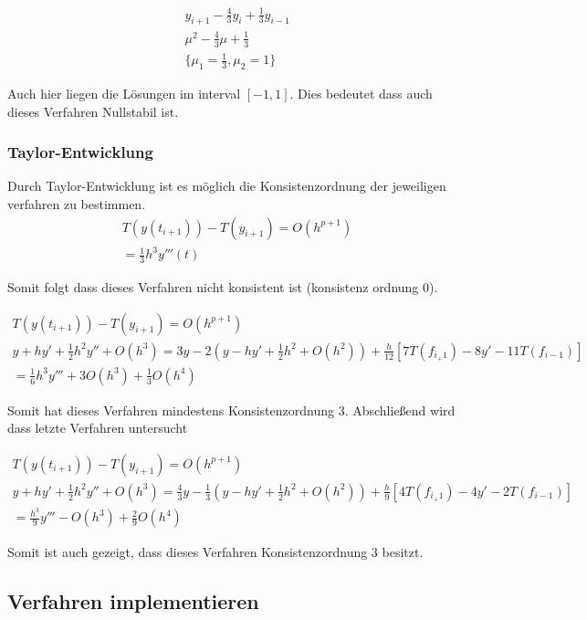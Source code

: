 \documentclass{article}
\newcommand\Section[1]{ %
  \addtocontents{toc}{\protect\setcounter{tocdepth}{0}}
  \subsubsection*{#1}
  \addtocontents{toc}{\protect\setcounter{tocdepth}{3}}}
\begin{document}
		\begin{align*}
			y_{i+1} - \frac{4}{3}y_{i} + \frac{1}{3}y_{i-1} \\
			\mu^{2} - \frac{4}{3}\mu + \frac{1}{3} \\
			\{ \mu_{1} = \frac{1}{3}, \mu_{2} = 1\}
		\end{align*}
		
		Auch hier liegen die Lösungen im interval $[-1,1]$. Dies bedeutet dass auch dieses Verfahren Nullstabil ist.
		
		\Section{Taylor-Entwicklung}
		
		Durch Taylor-Entwicklung ist es möglich die Konsistenzordnung der jeweiligen verfahren zu bestimmen.
		\begin{align*}
			T(y(t_{i+1})) - T(y_{i+1}) = O(h^{p+1}) \\
			= \frac{1}{3}h^{3}y'''(t)
		\end{align*}
		
		Somit folgt dass dieses Verfahren nicht konsistent ist (konsistenz ordnung 0).
		
		\begin{align*}
			T(y(t_{i+1})) - T(y_{i+1}) = O(h^{p+1}) \\
			y + hy' + \frac{1}{2}h^{2}y'' + O(h^{3}) = 3y -2(y-hy' + \frac{1}{2}h^{2}+O(h^{2})) +\frac{h}{12}[7T(f_{i_+1}) -8y' -11T(f_{i-1})] \\
			= \frac{1}{6}h^{3}y''' + 3O(h^{3}) + \frac{1}{3}O(h^{4})
		\end{align*}
		
		Somit hat dieses Verfahren mindestens Konsistenzordnung 3.
		Abschließend wird dass letzte Verfahren untersucht
		
		\begin{align*}
			T(y(t_{i+1})) - T(y_{i+1}) = O(h^{p+1}) \\
			y + hy' + \frac{1}{2}h^{2}y'' + O(h^{3}) = \frac{4}{3}y -\frac{1}{3}(y-hy' + \frac{1}{2}h^{2}+O(h^{2})) +\frac{h}{9}[4T(f_{i_+1}) -4y' -2T(f_{i-1})] \\
			= \frac{h^{3}}{9}y''' - O(h^{3}) + \frac{2}{9}O(h^{4})
		\end{align*}
		
		Somit ist auch gezeigt, dass dieses Verfahren Konsistenzordnung 3 besitzt.
		

	
	\subsection{Verfahren implementieren}
	
\end{document}
